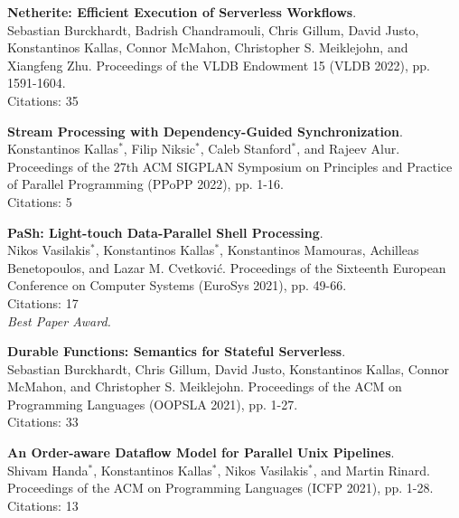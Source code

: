 \begin{minipage}{\textwidth}
\textbf{Netherite: Efficient Execution of Serverless Workflows}. \\
Sebastian Burckhardt, Badrish Chandramouli, Chris Gillum, David Justo, Konstantinos Kallas, Connor McMahon, Christopher S. Meiklejohn, and Xiangfeng Zhu.
Proceedings of the VLDB Endowment 15 (VLDB 2022), pp. 1591-1604. \\
Citations: 35
\end{minipage}

\begin{minipage}{\textwidth}
\textbf{Stream Processing with Dependency-Guided Synchronization}. \\
Konstantinos Kallas$^*$, Filip Niksic$^*$, Caleb Stanford$^*$, and Rajeev Alur.
Proceedings of the 27th ACM SIGPLAN Symposium on Principles and Practice of Parallel Programming (PPoPP 2022), pp. 1-16. \\
Citations: 5
\end{minipage}

\begin{minipage}{\textwidth}
\textbf{PaSh: Light-touch Data-Parallel Shell Processing}. \\
Nikos Vasilakis$^*$, Konstantinos Kallas$^*$, Konstantinos Mamouras, Achilleas Benetopoulos, and Lazar M. Cvetković.
Proceedings of the Sixteenth European Conference on Computer Systems (EuroSys 2021), pp. 49-66.\\
Citations: 17 \\
\emph{Best Paper Award.}
\end{minipage}

\begin{minipage}{\textwidth}
\textbf{Durable Functions: Semantics for Stateful Serverless}. \\
Sebastian Burckhardt, Chris Gillum, David Justo, Konstantinos Kallas, Connor McMahon, and Christopher S. Meiklejohn.
Proceedings of the ACM on Programming Languages (OOPSLA 2021), pp. 1-27. \\
Citations: 33
\end{minipage}

\begin{minipage}{\textwidth}
\textbf{An Order-aware Dataflow Model for Parallel Unix Pipelines}. \\
Shivam Handa$^*$, Konstantinos Kallas$^*$, Nikos Vasilakis$^*$, and Martin Rinard.
Proceedings of the ACM on Programming Languages (ICFP 2021), pp. 1-28. \\
Citations: 13
\end{minipage}    

